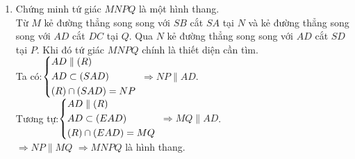 \begin{bt}
{\begin{enumerate}
{	
		}	
			mà $SH=\dfrac{1}{3}SB$ $\Rightarrow H$ là trọng tâm $\triangle SAC$ $\Rightarrow K$ là trung điểm của $SE$.\\	
			Xét $\triangle SED$ có\\
			$\heva{&KS=KE \\&CD=CE}$\\
			$\Rightarrow CK\parallel SD$.
			\item Chứng minh tứ giác $MNPQ$ là một hình thang.\\
			Từ $M$ kẻ đường thẳng song song với $SB$ cắt $SA$ tại $N$ và kẻ đường thẳng song song với $AD$ cắt $DC$ tại $Q$. Qua $N$ kẻ đường thẳng song song với $AD$ cắt $SD$ tại $P$. Khi đó tứ giác $MNPQ$ chính là thiết diện cần tìm.\\
			Ta có:$\left\{\begin{aligned}&AD \parallel (R)\\& AD \subset \left(SAD\right)\\& (R)\cap \left(SAD\right) = NP\end{aligned}\right.$
			$\Rightarrow NP \parallel AD$.\\
			Tương tự:$\left\{\begin{aligned}&AD \parallel (R)\\& AD \subset \left(EAD\right)\\& (R)\cap \left(EAD\right) = MQ\end{aligned}\right.$
			$\Rightarrow MQ \parallel AD$.\\
			$\Rightarrow NP \parallel MQ$ $\Rightarrow MNPQ$ là hình thang.
			
		\end{enumerate}
	}
\end{bt}


